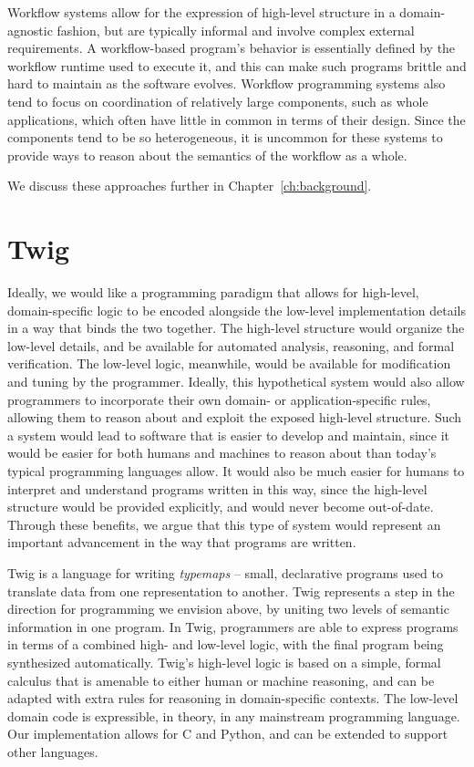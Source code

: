 Workflow systems allow for the expression of high-level structure
in a domain-agnostic fashion, but are typically informal and
involve complex external requirements. A workflow-based program's
behavior is essentially defined by the workflow runtime used to
execute it, and this can make such programs brittle and hard to
maintain as the software evolves. Workflow programming systems
also tend to focus on coordination of relatively large components,
such as whole applications, which often have little in common in
terms of their design. Since the components tend to be so
heterogeneous, it is uncommon for these systems to provide ways to
reason about the semantics of the workflow as a whole.

We discuss these approaches further in
Chapter~\ref{ch:background}.

\section{Twig}

Ideally, we would like a programming paradigm that allows for
high-level, domain-specific logic to be encoded alongside the
low-level implementation details in a way that binds the two
together. The high-level structure would organize the low-level
details, and be available for automated analysis, reasoning, and
formal verification. The low-level logic, meanwhile, would be
available for modification and tuning by the programmer. Ideally,
this hypothetical system would also allow programmers to
incorporate their own domain- or application-specific rules,
allowing them to reason about and exploit the exposed high-level
structure. Such a system would lead to software that is easier to
develop and maintain, since it would be easier for both humans and
machines to reason about than today's typical programming
languages allow. It would also be much easier for humans to
interpret and understand programs written in this way, since the
high-level structure would be provided explicitly, and would never
become out-of-date. Through these benefits, we argue that this
type of system would represent an important advancement in the way
that programs are written.

Twig is a language for writing \emph{typemaps} -- small,
declarative programs used to translate data from one
representation to another. Twig represents a step in the direction
for programming we envision above, by uniting two levels of
semantic information in one program. In Twig, programmers are able
to express programs in terms of a combined high- and low-level
logic, with the final program being synthesized automatically.
Twig's high-level logic is based on a simple, formal calculus that
is amenable to either human or machine reasoning, and can be
adapted with extra rules for reasoning in domain-specific
contexts. The low-level domain code is expressible, in theory, in
any mainstream programming language. Our implementation allows for
C and Python, and can be extended to support other languages.

